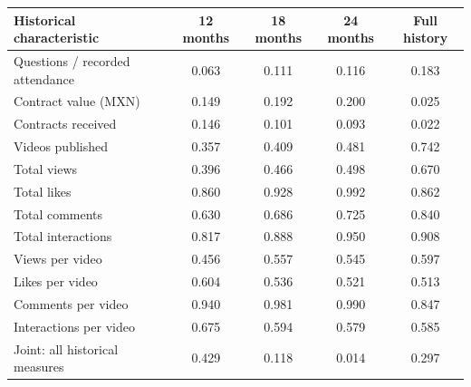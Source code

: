 \begingroup\small
\setlength{\tabcolsep}{3pt}
\renewcommand{\arraystretch}{1.25}
\noindent%
\begin{tabular*}{\linewidth}{@{\extracolsep{\fill}}lcccc@{}}
\toprule
Historical characteristic & 12 months & 18 months & 24 months & Full history \\
\midrule
Questions / recorded attendance & 0.063 & 0.111 & 0.116 & 0.183 \\
\addlinespace
Contract value (MXN) & 0.149 & 0.192 & 0.200 & 0.025 \\
Contracts received & 0.146 & 0.101 & 0.093 & 0.022 \\
\addlinespace
Videos published & 0.357 & 0.409 & 0.481 & 0.742 \\
Total views & 0.396 & 0.466 & 0.498 & 0.670 \\
Total likes & 0.860 & 0.928 & 0.992 & 0.862 \\
Total comments & 0.630 & 0.686 & 0.725 & 0.840 \\
Total interactions & 0.817 & 0.888 & 0.950 & 0.908 \\
Views per video & 0.456 & 0.557 & 0.545 & 0.597 \\
Likes per video & 0.604 & 0.536 & 0.521 & 0.513 \\
Comments per video & 0.940 & 0.981 & 0.990 & 0.847 \\
Interactions per video & 0.675 & 0.594 & 0.579 & 0.585 \\
\midrule
Joint: all historical measures & 0.429 & 0.118 & 0.014 & 0.297 \\
\bottomrule
\end{tabular*}\par\endgroup

